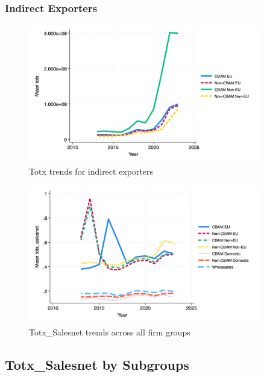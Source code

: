 \documentclass{article}
\begin{document}
\subsubsection{Indirect Exporters}
\begin{figure}[h!]
\centering
\includegraphics[width=0.9\textwidth]{totx_indir.png}
\caption{Totx trends for indirect exporters}
\label{fig:totx_indir}
\end{figure}

\begin{figure}[h!]
\centering
\includegraphics[width=0.9\textwidth]{totx_salesnet_main_groups.png}
\caption{Totx_Salesnet trends across all firm groups}
\label{fig:totx_salesnet_main}
\end{figure}

\subsection{Totx_Salesnet by Subgroups}
\end{document}
